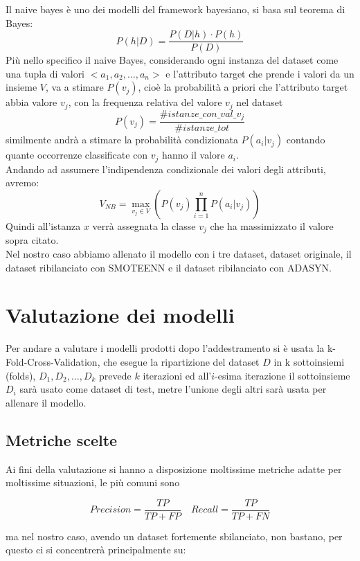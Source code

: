 \documentclass[italian,12pt,a4paper]{article}
\begin{document}
	Il naive bayes è uno dei modelli del framework bayesiano, si basa sul teorema di Bayes:
	$$P(h|D) = \frac{P(D|h)\cdot P(h)}{P(D)}$$
	Più nello specifico il naive Bayes, considerando ogni instanza del dataset come una tupla di valori $<a_1, a_2, \dots, a_n>$ e l'attributo target che prende i valori da un insieme $V$, va a stimare $P(v_j)$, cioè la probabilità a priori che l'attributo target abbia valore $v_j$, con la frequenza relativa del valore $v_j$ nel dataset $$P(v_j) = \frac{\#istanze\_con\_val\_v_j}{\#istanze\_tot}$$ similmente andrà a stimare la probabilità condizionata $P(a_i|v_j)$ contando quante occorrenze classificate con $v_j$ hanno il valore $a_i$. \\
	Andando ad assumere l'indipendenza condizionale dei valori degli attributi, avremo:
	$$V_{NB} = \max_{v_j \in V}(P(v_j)\prod_{i = 1}^{n} P(a_i|v_j))$$
	Quindi all'istanza $x$ verrà assegnata la classe $v_j$ che ha massimizzato il valore sopra citato. \\
	Nel nostro caso abbiamo allenato il modello con i tre dataset, dataset originale, il dataset ribilanciato con SMOTEENN e il dataset ribilanciato con ADASYN.
	
	\section{Valutazione dei modelli}
	Per andare a valutare i modelli prodotti dopo l'addestramento si è usata la k-Fold-Cross-Validation, che esegue la ripartizione del dataset $D$ in k sottoinsiemi (folds), $D_1, D_2, \dots, D_k$ prevede $k$ iterazioni ed all'$i$-esima iterazione il sottoinsieme $D_i$ sarà usato come dataset di test, metre l'unione degli altri sarà usata per allenare il modello.
	
	\subsection{Metriche scelte}
	Ai fini della valutazione si hanno a disposizione moltissime metriche adatte per moltissime situazioni, le più comuni sono
	
	$$Precision = \frac{TP}{TP+FP} \quad Recall = \frac{TP}{TP+FN}$$
	
	ma nel nostro caso, avendo un dataset fortemente sbilanciato, non bastano, per questo ci si concentrerà principalmente su:
	
\end{document}
